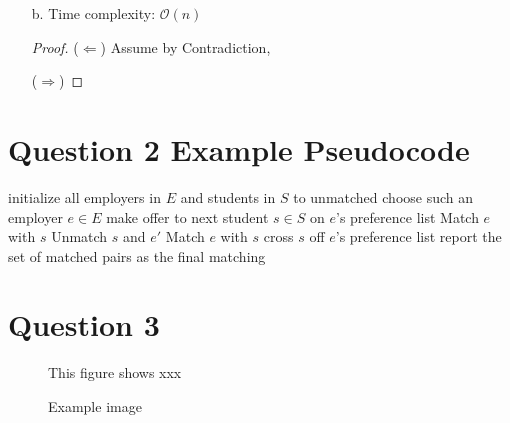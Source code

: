 \documentclass[11pt,fleqn]{article}
\newcommand{\bigO}{\ensuremath{\mathcal{O}}}
\theoremstyle{definition}
\theoremstyle{remark}
\begin{document}
\begin{enumerate}
\begin{proof}
        Finally, the number of unique RGB sequences of n dashes 
        is $3^n$ (as previously proven) which means that:

        \[
        \sum_{k=0}^{n} \binom{n}{k} 2^{k} = 3^n
        \]

        QED.

    \end{proof}
    
    \item[b.]
    Time complexity: $\bigO (n)$
    \begin{proof}
    ($\Leftarrow$) Assume by Contradiction,
    
    ($\Rightarrow$)
    \end{proof}
    
\end{enumerate}
\newpage
\clearpage
\section{Question 2 Example Pseudocode}

\begin{algorithmic}[1]
	\State initialize all employers in $E$ and students in $S$ to unmatched
	\State choose such an employer $e \in E$
	\State make offer to next student $s \in S$ on $e$'s preference list
	\State Match $e$ with $s$ 
	\State Unmatch $s$ and $e'$ 
	\State Match $e$ with $s$ 
	\EndIf
	\State cross $s$ off $e$'s preference list
	\EndWhile
	\State report the set of matched pairs as the final matching
	\EndFunction
\end{algorithmic}


\newpage
\section{Question 3}
\begin{figure}[!htb] 
\caption{Example image \label{fig:eg}}
{This figure shows xxx\bigskip}

\end{figure}
\newpage
\clearpage
\end{document}
